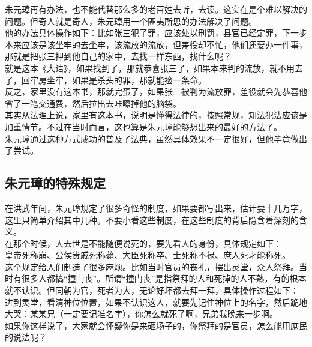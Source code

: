 \begin{multicols}{\theparacolNo}
朱元璋再有办法，也不能代替那么多的老百姓去听，去读。这实在是个难以解决的问题。但奇人就是奇人，朱元璋用一个匪夷所思的办法解决了问题。\\

他的办法具体操作如下：比如张三犯了罪，应该处以刑罚，县官已经定罪，下一步本来应该是该坐牢的去坐牢，该流放的流放，但差役却不忙，他们还要办一件事，那就是把张三押到他自己的家中，去找一样东西，找什么呢？\\

就是这本《大诰》，如果找到了，那就恭喜张三了，如果本来判的流放，就不用去了，回牢房坐牢，如果是杀头的罪，那就能捡一条命。\\

反之，家里没有这本书，那就完蛋了，如果张三被判为流放罪，差役就会先恭喜他省了一笔交通费，然后拉出去咔嚓掉他的脑袋。\\

其实从法理上说，家里有这本书，说明是懂得法律的，按照常规，知法犯法应该是加重情节。不过在当时而言，这也算是朱元璋能够想出来的最好的方法了。\\

朱元璋通过这种方式成功的普及了法典，虽然具体效果不一定很好，但他毕竟做出了尝试。\\

\subsection{朱元璋的特殊规定}
在洪武年间，朱元璋规定了很多奇怪的制度，如果要都写出来，估计要十几万字，这里只简单介绍其中几种。不要小看这些制度，在这些制度的背后隐含着深刻的含义。\\

在那个时候，人去世是不能随便说死的，要先看人的身份，具体规定如下：\\

皇帝死称崩、公侯贵戚死称薨、大臣死称卒、士死称不禄、庶人死才能称死。\\

这个规定给人们制造了很多麻烦。比如当时官员的丧礼，摆出灵堂，众人祭拜。当时有很多人都搞“撞门丧”。所谓“撞门丧”是指祭拜的人和死掉的人不熟，有的根本就不认识。但同朝为官，死者为大，无论好坏都去拜一拜，具体操作过程如下：\\

进到灵堂，看清神位位置，如果不认识这人，就要先记住神位上的名字，然后跪地大哭：某某兄（一定要记准名字），你怎么就死了啊，兄弟我晚来一步啊。\\

如果你这样说了，大家就会怀疑你是来砸场子的，你祭拜的是官员，怎么能用庶民的说法呢？\\


\end{multicols}
